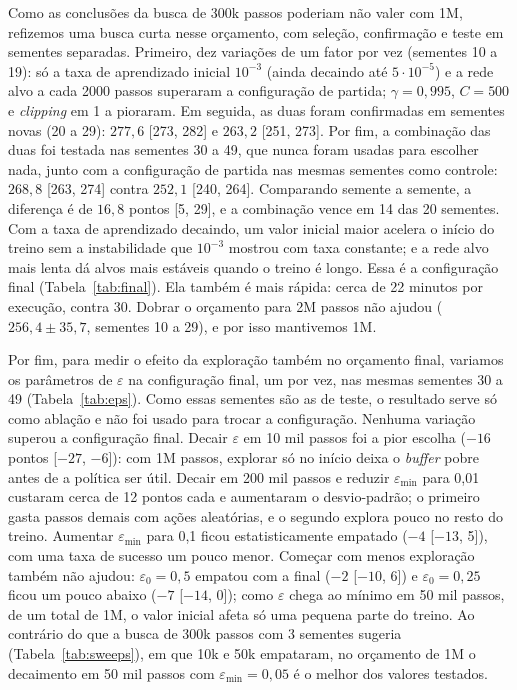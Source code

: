\documentclass[conference]{IEEEtran}
\begin{document}
Como as conclusões da busca de 300k passos poderiam não valer com 1M, refizemos uma busca curta nesse orçamento, com seleção, confirmação e teste em sementes separadas. Primeiro, dez variações de um fator por vez (sementes 10 a 19): só a taxa de aprendizado inicial $10^{-3}$ (ainda decaindo até $5\cdot10^{-5}$) e a rede alvo a cada 2000 passos superaram a configuração de partida; $\gamma=0{,}995$, $C=500$ e \textit{clipping} em 1 a pioraram. Em seguida, as duas foram confirmadas em sementes novas (20 a 29): $277{,}6$ [273, 282] e $263{,}2$ [251, 273]. Por fim, a combinação das duas foi testada nas sementes 30 a 49, que nunca foram usadas para escolher nada, junto com a configuração de partida nas mesmas sementes como controle: $268{,}8$ [263, 274] contra $252{,}1$ [240, 264]. Comparando semente a semente, a diferença é de $16{,}8$ pontos [5, 29], e a combinação vence em 14 das 20 sementes. Com a taxa de aprendizado decaindo, um valor inicial maior acelera o início do treino sem a instabilidade que $10^{-3}$ mostrou com taxa constante; e a rede alvo mais lenta dá alvos mais estáveis quando o treino é longo. Essa é a configuração final (Tabela~\ref{tab:final}). Ela também é mais rápida: cerca de 22 minutos por execução, contra 30. Dobrar o orçamento para 2M passos não ajudou ($256{,}4\pm35{,}7$, sementes 10 a 29), e por isso mantivemos 1M.

Por fim, para medir o efeito da exploração também no orçamento final, variamos os parâmetros de $\varepsilon$ na configuração final, um por vez, nas mesmas sementes 30 a 49 (Tabela~\ref{tab:eps}). Como essas sementes são as de teste, o resultado serve só como ablação e não foi usado para trocar a configuração. Nenhuma variação superou a configuração final. Decair $\varepsilon$ em 10 mil passos foi a pior escolha ($-16$ pontos [$-27$, $-6$]): com 1M passos, explorar só no início deixa o \textit{buffer} pobre antes de a política ser útil. Decair em 200 mil passos e reduzir $\varepsilon_{\min}$ para 0,01 custaram cerca de 12 pontos cada e aumentaram o desvio-padrão; o primeiro gasta passos demais com ações aleatórias, e o segundo explora pouco no resto do treino. Aumentar $\varepsilon_{\min}$ para 0,1 ficou estatisticamente empatado ($-4$ [$-13$, 5]), com uma taxa de sucesso um pouco menor. Começar com menos exploração também não ajudou: $\varepsilon_0=0{,}5$ empatou com a final ($-2$ [$-10$, 6]) e $\varepsilon_0=0{,}25$ ficou um pouco abaixo ($-7$ [$-14$, 0]); como $\varepsilon$ chega ao mínimo em 50 mil passos, de um total de 1M, o valor inicial afeta só uma pequena parte do treino. Ao contrário do que a busca de 300k passos com 3 sementes sugeria (Tabela~\ref{tab:sweeps}), em que 10k e 50k empataram, no orçamento de 1M o decaimento em 50 mil passos com $\varepsilon_{\min}=0{,}05$ é o melhor dos valores testados.
\end{document}
